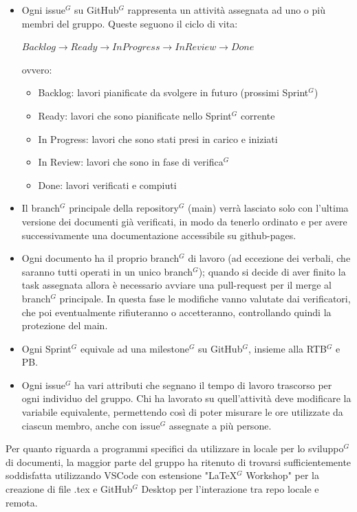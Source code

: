 \documentclass[a4paper,10pt]{article}
\begin{document}
\begin{enumerate}
    \begin{itemize}
        \item Ogni issue$^G$ su GitHub$^G$ rappresenta un attività assegnata ad uno o più membri del gruppo. Queste seguono il ciclo di vita:\\
        \begin{center}
            $ Backlog \rightarrow Ready \rightarrow In Progress \rightarrow In Review \rightarrow Done $
        \end{center}
        ovvero:
        \begin{itemize}
            \item Backlog: lavori pianificate da svolgere in futuro (prossimi Sprint$^G$)
            \item Ready: lavori che sono pianificate nello Sprint$^G$ corrente
            \item In Progress: lavori che sono stati presi in carico e iniziati
            \item In Review: lavori che sono in fase di verifica$^G$
            \item Done: lavori verificati e compiuti \\
        \end{itemize}
        \item Il branch$^G$ principale della repository$^G$ (main) verrà lasciato solo con l'ultima versione dei documenti già verificati, in modo da tenerlo ordinato e per avere successivamente una documentazione accessibile su github-pages. \\
        \item Ogni documento ha il proprio branch$^G$ di lavoro (ad eccezione dei verbali, che saranno tutti operati in un unico branch$^G$); quando si decide di aver finito la task assegnata allora è necessario avviare una pull-request per il merge al branch$^G$ principale. In questa fase le modifiche vanno valutate dai verificatori, che poi eventualmente rifiuteranno o accetteranno, controllando quindi la protezione del main. \\
        \item Ogni Sprint$^G$ equivale ad una milestone$^G$ su GitHub$^G$, insieme alla RTB$^G$ e PB. \\
        \item Ogni issue$^G$ ha vari attributi che segnano il tempo di lavoro trascorso per ogni individuo del gruppo. Chi ha lavorato su quell'attività deve modificare la variabile equivalente, permettendo così di poter misurare le ore utilizzate da ciascun membro, anche con issue$^G$ assegnate a più persone. \\
    \end{itemize}
\end{enumerate}
Per quanto riguarda a programmi specifici da utilizzare in locale per lo sviluppo$^G$ di documenti, la maggior parte del gruppo ha ritenuto di trovarsi sufficientemente soddisfatta utilizzando VSCode con estensione "LaTeX$^G$ Workshop" per la creazione di file .tex e GitHub$^G$ Desktop per l'interazione tra repo locale e remota. 
\end{document}
